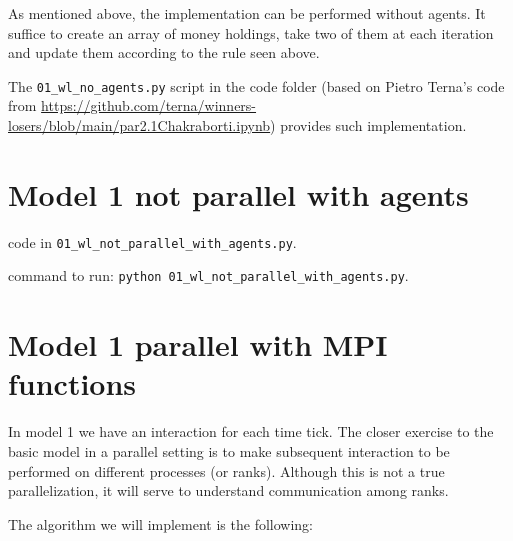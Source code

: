 \documentclass{article}
\begin{document}
As mentioned above, the implementation can be performed without agents.
It suffice to create an array of money holdings, take two of them at each iteration and update them according to the rule seen above.

The \verb+01_wl_no_agents.py+ script in the code folder (based on Pietro Terna's code from
\url{https://github.com/terna/winners-losers/blob/main/par2.1Chakraborti.ipynb}) provides such implementation.

\section{Model 1 not parallel with agents}

code in \verb+01_wl_not_parallel_with_agents.py+.

command to run: \verb+python 01_wl_not_parallel_with_agents.py+.

\section{Model 1 parallel with MPI functions}



In model 1 we have an interaction for each time tick. The
closer exercise to the basic model in a parallel setting is to make subsequent interaction
to be performed on different processes (or ranks). Although this is not
a true parallelization, it will serve to understand communication among
ranks.

The algorithm we will implement is the following:
\end{document}
